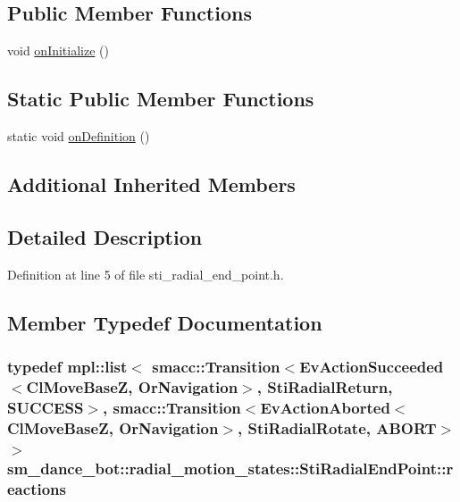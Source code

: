 \subsection*{Public Member Functions}
\begin{DoxyCompactItemize}
\item 
void \hyperlink{structsm__dance__bot_1_1radial__motion__states_1_1StiRadialEndPoint_a92cdcba71b7098c90be1165c49d2e477}{on\+Initialize} ()
\end{DoxyCompactItemize}
\subsection*{Static Public Member Functions}
\begin{DoxyCompactItemize}
\item 
static void \hyperlink{structsm__dance__bot_1_1radial__motion__states_1_1StiRadialEndPoint_a71dc19965a83ce1c1c132f27ce0ccb2d}{on\+Definition} ()
\end{DoxyCompactItemize}
\subsection*{Additional Inherited Members}


\subsection{Detailed Description}


Definition at line 5 of file sti\+\_\+radial\+\_\+end\+\_\+point.\+h.



\subsection{Member Typedef Documentation}
\subsubsection[{\texorpdfstring{reactions}{reactions}}]{\setlength{\rightskip}{0pt plus 5cm}typedef mpl\+::list$<$ {\bf smacc\+::\+Transition}$<$Ev\+Action\+Succeeded$<${\bf Cl\+Move\+BaseZ}, {\bf Or\+Navigation}$>$, {\bf Sti\+Radial\+Return}, {\bf S\+U\+C\+C\+E\+SS}$>$, {\bf smacc\+::\+Transition}$<$Ev\+Action\+Aborted$<${\bf Cl\+Move\+BaseZ}, {\bf Or\+Navigation}$>$, {\bf Sti\+Radial\+Rotate}, {\bf A\+B\+O\+RT}$>$ $>$ {\bf sm\+\_\+dance\+\_\+bot\+::radial\+\_\+motion\+\_\+states\+::\+Sti\+Radial\+End\+Point\+::reactions}}\hypertarget{structsm__dance__bot_1_1radial__motion__states_1_1StiRadialEndPoint_a4c90a71c9d5bc8b4f96cf74834b71abd}{}\label{structsm__dance__bot_1_1radial__motion__states_1_1StiRadialEndPoint_a4c90a71c9d5bc8b4f96cf74834b71abd}



